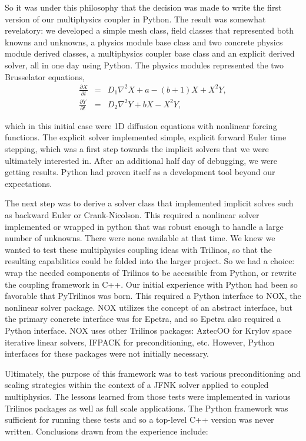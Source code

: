 \documentclass[11pt]{article}
\begin{document}
So it was under this philosophy that the decision was made to write the first version of our multiphysics coupler in Python.  The result was somewhat revelatory: we developed a simple mesh class, field classes that represented both knowns and unknowns, a physics module base class and two concrete physics module derived classes, a multiphysics coupler base class and an explicit derived solver, all in one day using Python.  The physics modules represented the two Brusselator equations,
\begin{eqnarray}
  \frac{\partial X}{\partial t} & = & D_1 \nabla^2 X + a - (b+1) X + X^2 Y, \\
  \frac{\partial Y}{\partial t} & = & D_2 \nabla^2 Y + b X - X^2 Y,
\end{eqnarray}

which in this initial case were 1D diffusion equations with nonlinear forcing functions.  The explicit solver implemented simple, explicit forward Euler time stepping, which was a first step towards the implicit solvers that we were ultimately interested in.  After an additional half day of debugging, we were getting results.  Python had proven itself as a development tool beyond our expectations.

The next step was to derive a solver class that implemented implicit solves such as backward Euler or Crank-Nicolson.  This required a nonlinear solver implemented or wrapped in python that was robust enough to handle a large number of unknowns.  There were none available at that time.  We knew we wanted to test these multiphysics coupling ideas with Trilinos, so that the resulting capabilities could be folded into the larger project.  So we had a choice: wrap the needed components of Trilinos to be accessible from Python, or rewrite the coupling framework in C++.  Our initial experience with Python had been so favorable that PyTrilinos was born.  This required a Python interface to NOX, the nonlinear solver package.  NOX utilizes the concept of an abstract interface, but the primary concrete interface was for Epetra, and so Epetra also required a Python interface.  NOX uses other Trilinos packages: AztecOO for Krylov space iterative linear solvers, IFPACK for preconditioning, etc.  However, Python interfaces for these packages were not initially necessary.

Ultimately, the purpose of this framework was to test various preconditioning and scaling strategies within the context of a JFNK solver applied to coupled multiphysics.  The lessons learned from those tests were implemented in various Trilinos packages as well as full scale applications.  The Python framework was sufficient for running these tests and so a top-level C++ version was never written.  Conclusions drawn from the experience include:
\end{document}
